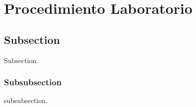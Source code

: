 \section{Procedimiento Laboratorio}
\subsection{Subsection}
Subsection.

\subsubsection{Subsubsection}
subsubsection.
